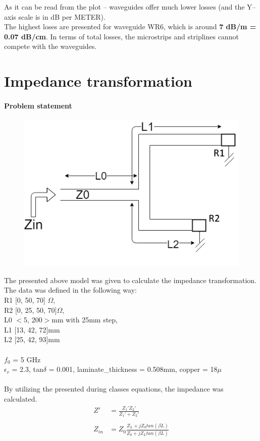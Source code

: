 \documentclass[eng,printmode]{mgr}
\begin{document}
\noindent
As it can be read from the plot -- waveguides offer much lower losses (and the Y--axis scale is in dB per METER).\\
The highest loses are presented for waveguide WR6, which is around \textbf{7 dB/m = 0.07 dB/cm}.
In terms of total losses, the microstrips and striplines cannot compete with the waveguides. 
\newpage

\chapter{Impedance transformation}
\subsubsection{Problem statement}
\begin{figure}[h]
	\centering
	\includegraphics[width=0.7\linewidth]{impedance}
	\label{fig:impedance}
\end{figure}
\noindent
The presented above model was given to calculate the impedance transformation.
The data was defined in the following way:\\
R1 [0, 50, 70] $\Omega$,\\
R2 [0, 25, 50, 70]$\Omega$,\\
L0 $<$5, 200$>$mm with 25mm step,\\
L1 [13, 42, 72]mm\\
L2 [25, 42, 93]mm\\
\\
$f_0$ = 5 GHz\\
$\epsilon _r$ = 2.3,  tan$\delta$ = 0.001, laminate\_thickness = 0.508mm, copper = 18$\mu$
\\
\\
By utilizing the presented during classes equations, the impedance was calculated.\\
\begin{align*}
Z' &= \frac{Z_1 ' Z_2 '}{Z_1 ' + Z_2 '}\\
\\
Z_{in} &= Z_0 \frac{Z_L + jZ_0tan(\beta L)}{Z_0 + jZ_Ltan(\beta L)}
\end{align*}
\end{document}
